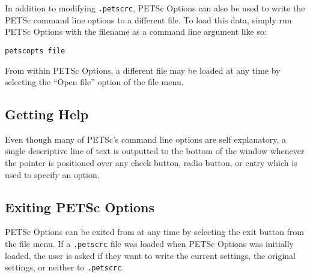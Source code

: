 In addition to modifying {\tt .petscrc}, PETSc Options can also be used to write the PETSc command line options to a different file.  To load this data, simply run PETSc Options with the filename as a command line argument like so:
\begin{verbatim}
petscopts file
\end{verbatim}
From within PETSc Options, a different file may be loaded at any time by selecting the ``Open file'' option of the file menu.

\subsection{Getting Help}

Even though many of PETSc's command line options are self explanatory, a single descriptive line of text is outputted to the bottom of the window whenever the pointer is positioned over any check button, radio button, or entry which is used to specify an option.

\subsection{Exiting PETSc Options}

PETSc Options can be exited from at any time by selecting the exit button from the file menu.  If a {\tt .petscrc} file was loaded when PETSc Options was initially loaded, the user is asked if they want to write the current settings, the original settings, or neither to {\tt .petscrc}.  











